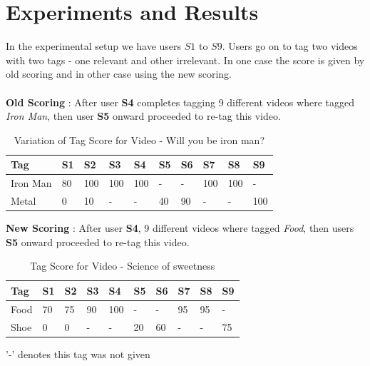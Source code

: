 \documentclass[12pt]{report}
\begin{document}
\pagebreak

\section{Experiments and Results}
In the experimental setup we have users $S1$ to $S9$. Users go on to tag two videos with two tags - one relevant and other irrelevant. In one case the score is given by old scoring and in other case using the new scoring.\\
\vspace{1em}\\
\textbf{Old Scoring} : 
After user \textbf{S4} completes tagging 9 different videos where tagged \emph{Iron Man}, then user \textbf{S5} onward proceeded to re-tag this video.

\begin{table}[!h]
\begin{center}

  \begin{tabular}{l l l l l l l l l l}
  \toprule
  \textbf{Tag} & \textbf{S1} & \textbf{S2} & \textbf{S3} & \textbf{S4} & \textbf{S5} & \textbf{S6}& \textbf{S7} & \textbf{S8} & \textbf{S9}\\
  \midrule
  Iron Man & 80 & 100 & 100 & 100 & -  & -  & 100 & 100 & -  \\
  Metal    & 0  & 10  & -   & -   & 40 & 90 & -   & -   & 100\\
  \bottomrule
  \end{tabular}
	\caption{Variation of Tag Score for Video - Will you be iron man?}

\end{center}
\end{table}

\vspace{2em}
\textbf{New Scoring} :
After user \textbf{S4}, 9 different videos where tagged \emph{Food}, then users \textbf{S5} onward proceeded to re-tag this video.

\begin{table}[!h]
\begin{center}

  \begin{tabular}{l l l l l l l l l l}
  \toprule
  \textbf{Tag} & \textbf{S1} & \textbf{S2} & \textbf{S3} & \textbf{S4} & \textbf{S5} & \textbf{S6}& \textbf{S7} & \textbf{S8} & \textbf{S9}\\
  \midrule
  Food & 70 & 75 & 90 & 100 & -  & -  & 95 & 95 & - \\
  Shoe & 0  & 0  & -  & -   & 20 & 60 & -  & -  & 75\\
  \bottomrule
  \end{tabular}
	\caption{Tag Score for Video - Science of sweetness}

\end{center}
\end{table}
'-' denotes this tag was not given
\end{document}
